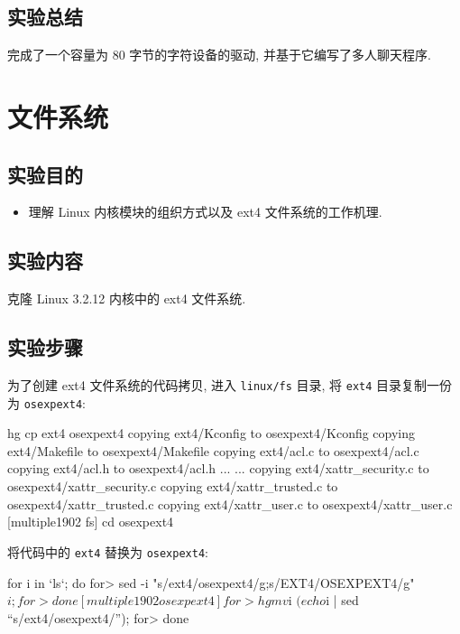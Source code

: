 \documentclass[11pt]{report}
\begin{document}
    \section{实验总结}

        完成了一个容量为 80 字节的字符设备的驱动, 并基于它编写了多人聊天程序.

\chapter{文件系统}

    \section{实验目的}

        \begin{itemize}
            \item 理解 Linux 内核模块的组织方式以及 ext4 文件系统的工作机理.
        \end{itemize}

    \section{实验内容}

        克隆 Linux 3.2.12 内核中的 ext4 文件系统.

    \section{实验步骤}

        为了创建 ext4 文件系统的代码拷贝, 进入 \verb|linux/fs| 目录, 将 \verb|ext4| 目录复制一份为 \verb|osexpext4|:

\begin{console}
[multiple1902 fs] hg cp ext4 osexpext4 
copying ext4/Kconfig to osexpext4/Kconfig
copying ext4/Makefile to osexpext4/Makefile
copying ext4/acl.c to osexpext4/acl.c
copying ext4/acl.h to osexpext4/acl.h
... ...
copying ext4/xattr_security.c to osexpext4/xattr_security.c
copying ext4/xattr_trusted.c to osexpext4/xattr_trusted.c
copying ext4/xattr_user.c to osexpext4/xattr_user.c
[multiple1902 fs] cd osexpext4
\end{console}

            将代码中的 \verb|ext4| 替换为 \verb|osexpext4|:

\begin{console}
 for i in `ls`; do
for> sed -i "s/ext4/osexpext4/g;s/EXT4/OSEXPEXT4/g" $i ;
for> done
[multiple1902 osexpext4]%
for> hg mv $i $(echo $i | sed ``s/ext4/osexpext4/''); 
for> done
\end{console}
\end{document}
